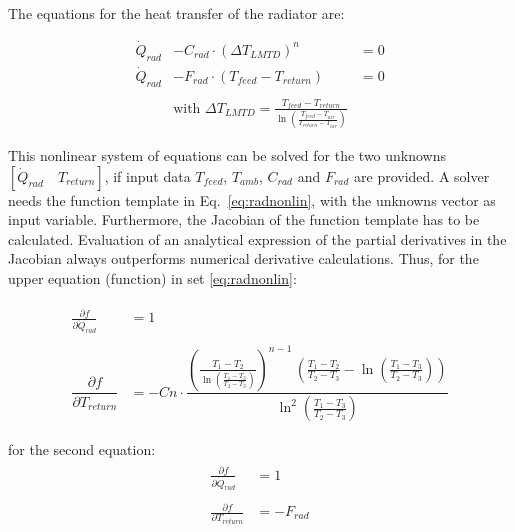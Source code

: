 The equations for the heat transfer of the radiator are: 

{\color{blue}
	\begin{equation}
		\label{eq:radnonlin}
		\begin{aligned}
			\dot{Q}_{rad} &- C_{rad} \cdot (\Delta T_{LMTD})^n &= 0 \\
			\dot{Q}_{rad} &- F_{rad} \cdot (T_{feed} - T_{return}) &= 0 \\ \\
			&\text{with } \Delta T_{LMTD} = \frac{T_{feed} - T_{return}}{\ln\left(\frac{T_{feed} -T_{air}}{T_{return} - T_{air}}\right)}
		\end{aligned}
	\end{equation}
}

This nonlinear system of equations can be solved for the two unknowns $[\dot{Q}_{rad} \quad T_{return}]$, if input data $T_{feed}$, $ T_{amb}$, $C_{rad}$ and $F_{rad}$ are provided. A solver needs the function template in Eq.~\ref{eq:radnonlin}, with the unknowns vector as input variable. Furthermore, the Jacobian of the function template has to be calculated. Evaluation of an analytical expression of the partial derivatives in the Jacobian always outperforms numerical derivative calculations. Thus, for the upper equation (function) in set \ref{eq:radnonlin}:

\begin{equation}
	\begin{aligned}
		\begin{matrix}
			\frac{\partial f}{\partial \dot{Q}_{rad}} &= 1 \\ 
			\\
			\dfrac{\partial f}{\partial T_{return}} &= -Cn\cdot \dfrac{\left(\frac{T_1-T_2}{\ln\left(\frac{T_1-T_3}{T_2-T_3}\right)}\right)^{n-1}\,\left(\frac{T_1-T_2}{T_2-T_3}-\ln\left(\frac{T_1-T_3}{T_2-T_3}\right)\right)}{\ln^2\left(\frac{T_1-T_3}{T_2-T_3}\right)} \\ \\
		\end{matrix}
	\end{aligned}
\end{equation} 
for the second equation:
\begin{equation}
	\begin{aligned}
		\begin{matrix}
			\frac{\partial f}{\partial \dot{Q}_{rad}} &= 1 \\ \\
			\frac{\partial f}{\partial T_{return}} &= -F_{rad}
		\end{matrix}
	\end{aligned}
\end{equation} 

